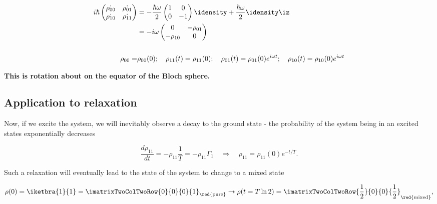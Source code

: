 \begin{itemize}
  \begin{equation}\label{key}
    \begin{aligned}
      i\hbar
      \begin{pmatrix}
        \dot{\rho_{00}}                                               &
        \dot{\rho_{01}}\\\dot{\rho_{10}}&\dot{\rho_{11}}
      \end{pmatrix}
      & = -\frac{\hbar\omega}{2}
      \begin{pmatrix}
        1 & 0\\0&-1
      \end{pmatrix}
      \idensity + \frac{\hbar\omega}{2}\idensity\iz \\
      & = {-i\omega}{}
      \begin{pmatrix}
        0 & -\rho_{01}\\-\rho_{10}&0
      \end{pmatrix}\\\\
      \rho_{00}        =       &\rho_{00}(0);\quad\rho_{11}(t)        =
      \rho_{11}(0);\quad\rho_{01}(t)      =      \rho_{01}(0)e^{i\omega
        t};\quad\rho_{10}(t) = \rho_{10}(0)e^{i\omega t}
    \end{aligned}
  \end{equation}
\end{itemize}

\textbf{This is rotation about on the equator of the Bloch sphere.}

\subsection{Application to relaxation}
Now, if we excite the system, we will inevitably observe a decay to the
ground state - the probability of the system being in an excited states
exponentially decreases

 \begin{equation}\label{relaxationRaw}
   \frac{d\rho_{11}}{dt}=-\rho_{11}\frac{1}{T} =  -\rho_{11}\Gamma_1\quad\Rightarrow\quad\rho_{11} = \rho_{11}(0)e^{-t/T}.
 \end{equation}

 \noindent Such a  relaxation will eventually lead to the  state of the
 system to change to a mixed state

 \begin{equation}\label{relax2}
   \rho(0) = \iketbra{1}{1} = \imatrixTwoColTwoRow{0}{0}{0}{1}_{\red{\text{pure}}} \rightarrow \rho(t=T\ln2) =\imatrixTwoColTwoRow{\frac{1}{2}}{0}{0}{\frac{1}{2}}_{\red{\text{mixed}}},
 \end{equation}

